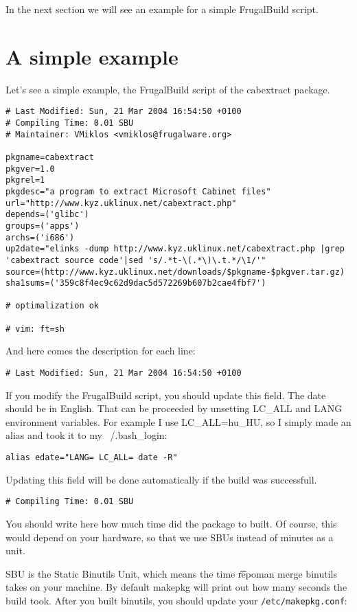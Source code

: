 In the next section we will see an example for a simple FrugalBuild script.

\section{A simple example}
Let's see a simple example, the FrugalBuild script of the cabextract package.
\begin{verbatim}
# Last Modified: Sun, 21 Mar 2004 16:54:50 +0100
# Compiling Time: 0.01 SBU
# Maintainer: VMiklos <vmiklos@frugalware.org>

pkgname=cabextract
pkgver=1.0
pkgrel=1
pkgdesc="a program to extract Microsoft Cabinet files"
url="http://www.kyz.uklinux.net/cabextract.php"
depends=('glibc')
groups=('apps')
archs=('i686')
up2date="elinks -dump http://www.kyz.uklinux.net/cabextract.php |grep 'cabextract source code'|sed 's/.*t-\(.*\)\.t.*/\1/'"
source=(http://www.kyz.uklinux.net/downloads/$pkgname-$pkgver.tar.gz)
sha1sums=('359c8f4ec9c62d9dac5d572269b607b2cae4fbf7')

# optimalization ok

# vim: ft=sh
\end{verbatim}

And here comes the description for each line:
\begin{verbatim}
# Last Modified: Sun, 21 Mar 2004 16:54:50 +0100
\end{verbatim}

If you modify the FrugalBuild script, you should update this field. The date
should be in English. That can be proceeded by unsetting LC\_ALL and LANG
environment variables. For example I use LC\_ALL=hu\_HU, so I simply made an
alias and took it to my ~/.bash\_login:
\begin{verbatim}
alias edate="LANG= LC_ALL= date -R"
\end{verbatim}

Updating this field will be done automatically if the build was successfull.

\begin{verbatim}
# Compiling Time: 0.01 SBU
\end{verbatim}

You should write here how much time did the package to built. Of course, this would depend on your hardware, so that we use SBUs instead of minutes as a unit.

SBU is the Static Binutils Unit, which means the time {\t repoman merge binutils} takes on your machine. By default makepkg will print out how many seconds the build took. After you built binutils, you should update your {\tt /etc/makepkg.conf}:

